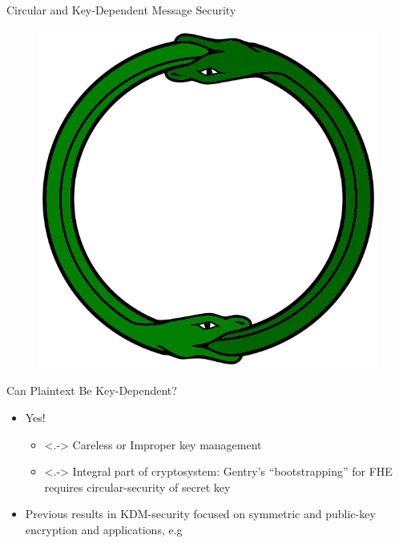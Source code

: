 \begin{frame}{Circular and Key-Dependent Message Security}
  \begin{figure}
    \includegraphics[width=.25\textwidth]{circularsecuresnake2.png}
  \end{figure}
  \begin{block}{Can Plaintext Be Key-Dependent?}
    \begin{itemize}
    \item<+-> Yes!
      \begin{itemize}
      \item<.-> Careless or Improper key management
      \item<.-> Integral part of cryptosystem: Gentry's
        ``bootstrapping'' for FHE requires circular-security of secret
        key 
      \end{itemize}
    \item<+-> Previous results in KDM-security focused on \alert{symmetric}
      and \alert{public-key} encryption and applications, e.g
    \end{itemize}
  \end{block}

\end{frame}

